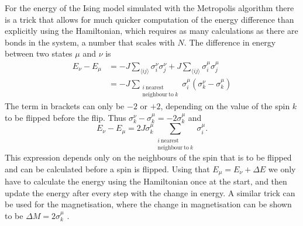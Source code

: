 \documentclass[11pt, a4paper]{report} %
\begin{document}
For the energy of the Ising model simulated with the Metropolis algorithm there is a trick that allows for much quicker computation of the energy difference than explicitly using the Hamiltonian, which requires as many calculations as there are bonds in the system, a number that scales with \(N\).
The difference in energy between two states \(\mu\) and \(\nu\) is
\begin{align}
	E_{\nu} - E_{\mu} &= -J \sum_{\langle ij \rangle} \sigma_i^{\nu} \sigma_j^{\nu} + J \sum_{\langle ij \rangle} \sigma_i^{\mu} \sigma_j^{\mu}\\
	&= -J \sum_{\substack{i\ \mathrm{nearest}\\ \mathrm{neighbour\ to}\ k}} \sigma_i^{\mu}\left(\sigma_k^{\nu} - \sigma_k^{\mu}\right)
\end{align}
The term in brackets can only be \(-2\) or \(+2\), depending on the value of the spin \(k\) to be flipped before the flip.
Thus \(\sigma_k^{\nu} - \sigma_k^{\mu} = -2 \sigma_k^{\mu}\) and
\begin{equation}
	E_{\nu} - E_{\mu} = 2 J \sigma_k^{\mu} \sum_{\substack{i\ \mathrm{nearest}\\ \mathrm{neighbour\ to}\ k}} \sigma_i^{\mu}.
\end{equation}
This expression depends only on the neighbours of the spin that is to be flipped and can be calculated before a spin is flipped.
Using that \(E_{\mu} = E_{\nu} + \Delta E\) we only have to calculate the energy using the Hamiltonian once at the start, and then update the energy after every step with the change in energy.
A similar trick can be used for the magnetisation, where the change in magnetisation can be shown to be \(\Delta M = 2\sigma_k^{\mu}\) \cite{newman:1999}.
\end{document}
